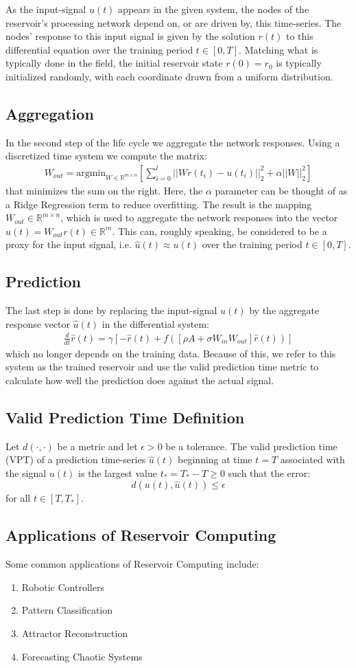 \documentclass[12pt,oneside]{article}
\theoremstyle{plain}
\begin{document}
As the input-signal $u(t)$ appears in the given system, the nodes of the reservoir's processing network depend on, or are driven by, this time-series.  The nodes' response
to this input signal is given by the solution $r(t)$ to this differential equation over the training period $t \in [0,T]$.  Matching what is typically done in the field,
the initial reservoir state $r(0) = r_0$ is typically initialized randomly, with each coordinate drawn from a uniform distribution.

\subsection{Aggregation}
In the second step of the life cycle we aggregate the network responses.  Using a discretized time system we compute the matrix:
\begin{align*}
    W_{out} = \text{argmin}_{W \in \mathbb{R}^{m \times n}} \left [ \sum_{i=0}^l ||Wr(t_i) - u(t_i)||_2^2 + \alpha ||W||_2^2 \right ]
\end{align*}
that minimizes the sum on the right.  Here, the $\alpha$ parameter can be thought of as a Ridge Regression term to reduce overfitting.
The result is the mapping $W_{out} \in \mathbb{R}^{m \times n}$, which is used to aggregate the network responses into the vector $\hat{u}(t) = W_{out}r(t) \in \mathbb{R}^m$.
This can, roughly speaking, be considered to be a proxy for the input signal, i.e. $\hat{u}(t) \approx u(t)$ over the training period $t \in [0,T]$.

\subsection{Prediction}
The last step is done by replacing the input-signal $u(t)$ by the aggregate response vector $\hat{u}(t)$ in the differential system:
\begin{align*}
    \frac{d}{dt}\hat{r}(t) = \gamma[-\hat{r}(t) + f([\rho A + \sigma W_{in}W_{out}]\hat{r}(t))]
\end{align*}
which no longer depends on the training data.  Because of this, we refer to this system as the trained reservoir and use the valid prediction time metric to calculate how well 
the prediction does against the actual signal.

\subsection{Valid Prediction Time Definition}
Let $d(\cdot, \cdot)$ be a metric and let $\epsilon > 0$ be a tolerance.  The valid prediction time (VPT) of a prediction time-series $\hat{u}(t)$ beginning at time $t = T$
associated with the signal $u(t)$ is the largest value $t_* = T_* - T \geq 0$ such that the error:
\[d(u(t),\hat{u}(t)) \leq \epsilon\]
for all $t \in [T,T_*]$.

\subsection{Applications of Reservoir Computing}
Some common applications of Reservoir Computing include:
\begin{enumerate}
    \item Robotic Controllers
    \item Pattern Classification
    \item Attractor Reconstruction
    \item Forecasting Chaotic Systems
\end{enumerate}
\end{document}
